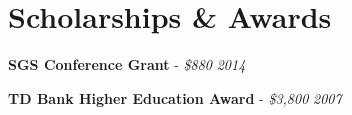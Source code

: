 \section{\sc Scholarships \& Awards}

\textbf{SGS Conference Grant} - {\em \$880} \hfill {\em 2014}

\textbf{TD Bank Higher Education Award} - {\em \$3,800} \hfill {\em 2007}